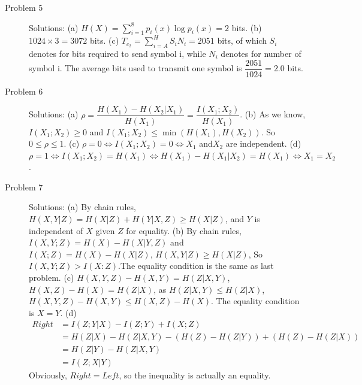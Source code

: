 \documentclass[11pt]{article}
\begin{document}
\begin{description}
    \item[Problem 5] Solutions:
        \subitem(a) $H(X)=\displaystyle\sum_{i=1}^{8}p_i(x)\log p_i(x)=2$ bits.
        \subitem(b) $1024\times 3=3072$ bits.
        \subitem(c) $T_{c_2}=\displaystyle\sum_{i=A}^{H}S_{i}N_i=2051$ bits, of which $S_i$ denotes for bits required to send symbol i, while $N_i$ denotes for number of symbol i.
        The average bits used to transmit one symbol is $\dfrac{2051}{1024}=2.0$ bits.
    \item[Problem 6] Solutions:
        \subitem(a) $\rho=\dfrac{H(X_1)-H(X_2|X_1)}{H(X_1)}=\dfrac{I(X_1;X_2)}{H(X_1)}$.
        \subitem(b) As we know,$I(X_1;X_2)\geq 0$ and $I(X_1;X_2)\leq \min(H(X_1),H(X_2))$. So $0\leq \rho \leq 1$.
        \subitem(c) $\rho = 0\Leftrightarrow I(X_1;X_2)=0\Leftrightarrow X_1$ and$X_2$ are independent.
        \subitem(d) $\rho = 1\Leftrightarrow I(X_1;X_2)=H(X_1)\Leftrightarrow H(X_1)-H(X_1|X_2)=H(X_1)\Leftrightarrow X_1=X_2$.
    \item[Problem 7] Solutions:
        \subitem(a) By chain rules, $H(X,Y|Z)=H(X|Z)+H(Y|X,Z)\geq H(X|Z)$, and $Y$ is independent of $X$ given $Z$ for equality.
        \subitem(b) By chain rules, $I(X,Y;Z)=H(X)-H(X|Y,Z)$ and $I(X;Z)=H(X)-H(X|Z)$, $H(X,Y|Z)\geq H(X|Z)$, So $I(X,Y;Z)>I(X:Z)$.The equality condition is the same as last problem.
        \subitem(c) $H(X,Y,Z)-H(X,Y)=H(Z|X,Y)$,$H(X,Z)-H(X)=H(Z|X)$, as $H(Z|X,Y)\leq H(Z|X)$, $H(X,Y,Z)-H(X,Y)\leq H(X,Z)-H(X)$. The equality condition is $X=Y$.
        \subitem(d)\[\begin{aligned}
                          Right&=I(Z;Y|X)-I(Z;Y)+I(X;Z)\\&=H(Z|X)-H(Z|X,Y)-(H(Z)-H(Z|Y))+(H(Z)-H(Z|X))\\&=H(Z|Y)-H(Z|X,Y)\\&=I(Z;X|Y)
                    \end{aligned}\]
                Obviously, $Right=Left$, so the inequality is actually an equality.
\end{description}
\end{document}

